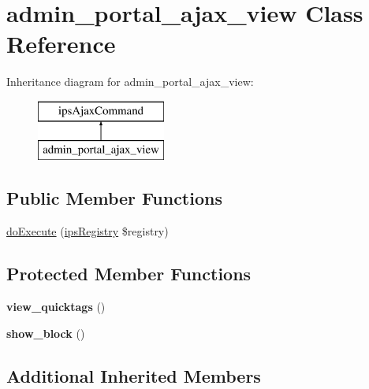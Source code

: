 \hypertarget{classadmin__portal__ajax__view}{\section{admin\-\_\-portal\-\_\-ajax\-\_\-view Class Reference}
\label{classadmin__portal__ajax__view}
}
Inheritance diagram for admin\-\_\-portal\-\_\-ajax\-\_\-view\-:\begin{figure}[H]
\begin{center}
\leavevmode
\includegraphics[height=2.000000cm]{classadmin__portal__ajax__view}
\end{center}
\end{figure}
\subsection*{Public Member Functions}
\begin{DoxyCompactItemize}
\item 
\hyperlink{classadmin__portal__ajax__view_afbc4e912a0604b94d47d66744c64d8ba}{do\-Execute} (\hyperlink{classips_registry}{ips\-Registry} \$registry)
\end{DoxyCompactItemize}
\subsection*{Protected Member Functions}
\begin{DoxyCompactItemize}
\item 
\hypertarget{classadmin__portal__ajax__view_ad469390cf4f2e276e0cd053d9e7a175f}{{\bfseries view\-\_\-quicktags} ()}\label{classadmin__portal__ajax__view_ad469390cf4f2e276e0cd053d9e7a175f}

\item 
\hypertarget{classadmin__portal__ajax__view_aaf8acb00228cb0278c4615be6dd91450}{{\bfseries show\-\_\-block} ()}\label{classadmin__portal__ajax__view_aaf8acb00228cb0278c4615be6dd91450}

\end{DoxyCompactItemize}
\subsection*{Additional Inherited Members}


